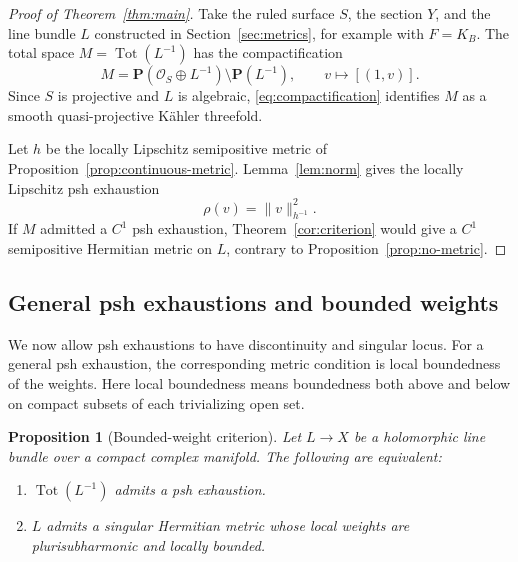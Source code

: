 \documentclass[11pt]{amsart}
\newtheorem{proposition}[theorem]{Proposition}
\theoremstyle{definition}
\theoremstyle{remark}
\numberwithin{equation}{section}
\newcommand{\PP}{\mathbf P}
\newcommand{\OO}{\mathcal O}
\newcommand{\Tot}{\operatorname{Tot}}
\begin{document}
\begin{proof}[Proof of Theorem~\ref{thm:main}]\label{sec:conclusion}
Take the ruled surface $S$, the section $Y$, and the line bundle $L$
constructed in Section~\ref{sec:metrics}, for example with $F=K_B$.
The total space $M=\Tot(L^{-1})$ has the compactification
\begin{equation}\label{eq:compactification}
 M=\PP(\OO_S\oplus L^{-1})
 \setminus\PP(L^{-1}),\qquad
 v\longmapsto[(1,v)].
\end{equation}
Since $S$ is projective and $L$ is algebraic,
\eqref{eq:compactification} identifies $M$ as a smooth
quasi-projective K\"ahler threefold.

Let $h$ be the locally Lipschitz semipositive metric of
Proposition~\ref{prop:continuous-metric}. Lemma~\ref{lem:norm}
gives the locally Lipschitz psh exhaustion
\begin{equation}\label{eq:explicit-exhaustion}
 \rho(v)=\|v\|_{h^{-1}}^2.
\end{equation}
If $M$ admitted a $C^1$ psh exhaustion,
Theorem~\ref{cor:criterion} would give a $C^1$ semipositive
Hermitian metric on $L$, contrary to Proposition~\ref{prop:no-metric}.
\end{proof}

\subsection{General psh exhaustions and bounded weights}
\label{subsec:bounded-weights}

We now allow psh exhaustions to have discontinuity and singular locus. For a general psh exhaustion, the corresponding metric
condition is local boundedness of the weights.
Here local boundedness means boundedness both above and below on compact subsets of each trivializing open set.

\begin{proposition}[Bounded-weight criterion]
\label{prop:bounded-weight-criterion}
Let $L\to X$ be a holomorphic line bundle over a compact complex
manifold. The following are equivalent:
\begin{enumerate}[label=\textup{(\roman*)},leftmargin=2.5em]
\item $\Tot(L^{-1})$ admits a psh exhaustion.
\item $L$ admits a singular Hermitian metric whose local weights
      are plurisubharmonic and locally bounded.
\end{enumerate}
\end{proposition}
\end{document}
